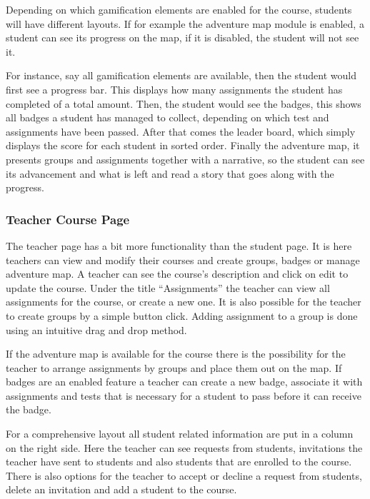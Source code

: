 Depending on which gamification elements are enabled for the course, students will have different layouts. If for example the adventure map module is enabled, a student can see its progress on the map, if it is disabled, the student will not see it.

For instance, say all gamification elements are available, then the student would first see a progress bar. This displays how many assignments the student has completed of a total amount. Then, the student would see the badges, this shows all badges a student has managed to collect, depending on which test and assignments have been passed. After that comes the leader board, which simply displays the score for each student in sorted order. Finally the adventure map, it presents groups and assignments together with a narrative, so the student can see its advancement and what is left and read a story that goes along with the progress.

\subsubsection{Teacher Course Page}
The teacher page has a bit more functionality than the student page. It is here teachers can view and modify their courses and create groups, badges or manage adventure map. A teacher can see the course's description and click on edit to update the course. Under the title ``Assignments'' the teacher can view all assignments for the course, or create a new one. It is also possible for the teacher to create groups by a simple button click. Adding assignment to a group is done using an intuitive drag and drop method. 

If the adventure map is available for the course there is the possibility for the teacher to arrange assignments by groups and place them out on the map. If badges are an enabled feature a teacher can create a new badge, associate it with assignments and tests that is necessary for a student to pass before it can receive the badge.

For a comprehensive layout all student related information are put in a column on the right side. Here the teacher can see requests from students, invitations the teacher have sent to students and also students that are enrolled to the course. There is also options for the teacher to accept or decline a request from students, delete an invitation and add a student to the course. 

